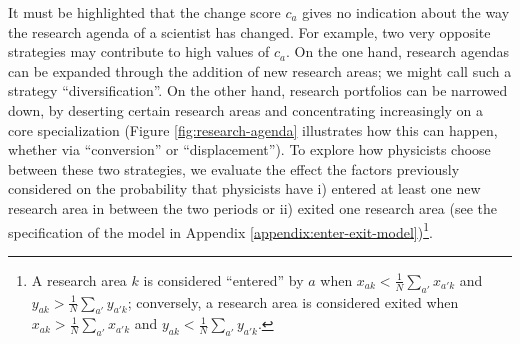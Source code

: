 \documentclass{article}
\begin{document}
It must be highlighted that the change score $c_a$ gives no indication about the way the research agenda of a scientist has changed. For example, two very opposite strategies may contribute to high values of $c_a$. On the one hand, research agendas can be expanded through the addition of new research areas; we might call such a strategy ``diversification''. On the other hand, research portfolios can be narrowed down, by deserting certain research areas and concentrating increasingly on a core specialization (Figure \ref{fig:research-agenda} illustrates how this can happen, whether via ``conversion'' or ``displacement''). To explore how physicists choose between these two strategies, we evaluate the effect the factors previously considered on the probability that physicists have i) entered at least one new research area in between the two periods or ii) exited one research area (see the specification of the model in Appendix \ref{appendix:enter-exit-model})\footnote{A research area $k$ is considered ``entered'' by $a$ when $x_{ak}<\frac{1}{N}\sum_{a'}x_{a'k}$ and $y_{ak}>\frac{1}{N}\sum_{a'}y_{a'k}$; conversely, a research area is considered exited when $x_{ak}>\frac{1}{N}\sum_{a'}x_{a'k}$ and $y_{ak}<\frac{1}{N}\sum_{a'}y_{a'k}$.}.



\end{document}
